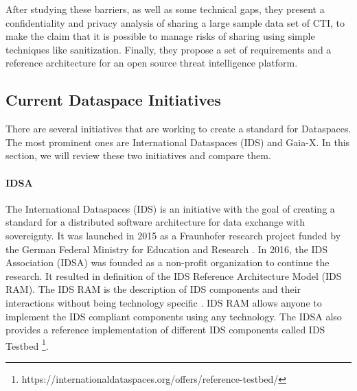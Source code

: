 \documentclass{article}
\begin{document}
After studying these barriers, as well as some technical gaps, they present a confidentiality and privacy analysis of sharing a large sample data set of CTI, to make the claim that it is possible to manage risks of sharing using simple techniques like sanitization. Finally, they propose a set of requirements and a reference architecture for an open source threat intelligence platform. 


\subsection{Current Dataspace Initiatives}
There are several initiatives that are working to create a standard for Dataspaces. The most prominent ones are International Dataspaces (IDS) and Gaia-X. In this section, we will review these two initiatives and compare them.

\paragraph{IDSA}

The International Dataspaces (IDS) is an initiative with the goal of creating a standard for a distributed software architecture for data exchange with sovereignty. It was launched in 2015 as a Fraunhofer research project funded by the German Federal Ministry for Education and Research \cite{otto_evolution_2022}. In 2016, the IDS Association (IDSA) was founded as a non-profit organization to continue the research. It resulted in definition of the IDS Reference Architecture Model (IDS RAM). The IDS RAM is the description of IDS components and their interactions without being technology specific \cite{otto_evolution_2022}. IDS RAM allows anyone to implement the IDS compliant components using any technology. The IDSA also provides a reference implementation of different IDS components called IDS Testbed \footnote{https://internationaldataspaces.org/offers/reference-testbed/}. 
\end{document}
